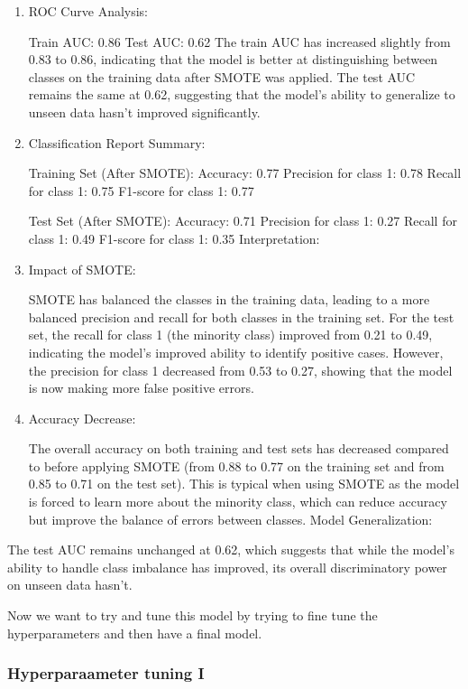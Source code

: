 \documentclass[11pt]{article}
\begin{document}
\begin{enumerate}
\def\labelenumi{\arabic{enumi}.}
\item
  ROC Curve Analysis:

  Train AUC: 0.86 Test AUC: 0.62 The train AUC has increased slightly
  from 0.83 to 0.86, indicating that the model is better at
  distinguishing between classes on the training data after SMOTE was
  applied. The test AUC remains the same at 0.62, suggesting that the
  model's ability to generalize to unseen data hasn't improved
  significantly.
\item
  Classification Report Summary:

  Training Set (After SMOTE): Accuracy: 0.77 Precision for class 1: 0.78
  Recall for class 1: 0.75 F1-score for class 1: 0.77

  Test Set (After SMOTE): Accuracy: 0.71 Precision for class 1: 0.27
  Recall for class 1: 0.49 F1-score for class 1: 0.35 Interpretation:
\item
  Impact of SMOTE:

  SMOTE has balanced the classes in the training data, leading to a more
  balanced precision and recall for both classes in the training set.
  For the test set, the recall for class 1 (the minority class) improved
  from 0.21 to 0.49, indicating the model's improved ability to identify
  positive cases. However, the precision for class 1 decreased from 0.53
  to 0.27, showing that the model is now making more false positive
  errors.
\item
  Accuracy Decrease:

  The overall accuracy on both training and test sets has decreased
  compared to before applying SMOTE (from 0.88 to 0.77 on the training
  set and from 0.85 to 0.71 on the test set). This is typical when using
  SMOTE as the model is forced to learn more about the minority class,
  which can reduce accuracy but improve the balance of errors between
  classes. Model Generalization:
\end{enumerate}

The test AUC remains unchanged at 0.62, which suggests that while the
model's ability to handle class imbalance has improved, its overall
discriminatory power on unseen data hasn't.

Now we want to try and tune this model by trying to fine tune the
hyperparameters and then have a final model.

\subsubsection{Hyperparaameter tuning I}\label{hyperparaameter-tuning-i}
\end{document}
